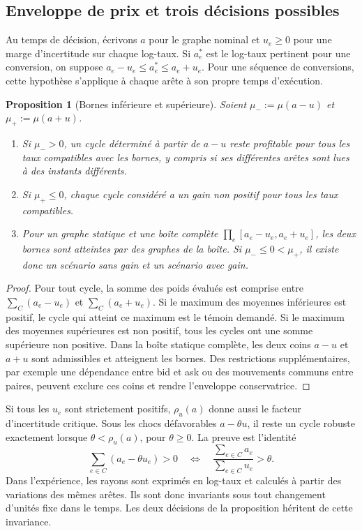 \documentclass[11pt,a4paper]{article}
\theoremstyle{clair}
\newtheorem{proposition}{Proposition}[section]
\begin{document}
\clearpage
\subsection{Enveloppe de prix et trois décisions possibles}

Au temps de décision, écrivons $a$ pour le graphe nominal et $u_e\ge0$ pour une marge d'incertitude sur chaque log-taux. Si $a_e^\ast$ est le log-taux pertinent pour une conversion, on suppose $a_e-u_e\le a_e^\ast\le a_e+u_e$. Pour une séquence de conversions, cette hypothèse s'applique à chaque arête à son propre temps d'exécution.

\begin{proposition}[Bornes inférieure et supérieure]
\label{prop:robust}
Soient $\mu_-:=\mu(a-u)$ et $\mu_+:=\mu(a+u)$.
\begin{enumerate}
 \item Si $\mu_->0$, un cycle déterminé à partir de $a-u$ reste profitable pour tous les taux compatibles avec les bornes, y compris si ses différentes arêtes sont lues à des instants différents.
 \item Si $\mu_+\le0$, chaque cycle considéré a un gain non positif pour tous les taux compatibles.
 \item Pour un graphe statique et une boîte complète $\prod_e[a_e-u_e,a_e+u_e]$, les deux bornes sont atteintes par des graphes de la boîte. Si $\mu_-\le0<\mu_+$, il existe donc un scénario sans gain et un scénario avec gain.
\end{enumerate}
\end{proposition}
\begin{proof}
Pour tout cycle, la somme des poids évalués est comprise entre $\sum_C(a_e-u_e)$ et $\sum_C(a_e+u_e)$. Si le maximum des moyennes inférieures est positif, le cycle qui atteint ce maximum est le témoin demandé. Si le maximum des moyennes supérieures est non positif, tous les cycles ont une somme supérieure non positive. Dans la boîte statique complète, les deux coins $a-u$ et $a+u$ sont admissibles et atteignent les bornes. Des restrictions supplémentaires, par exemple une dépendance entre bid et ask ou des mouvements communs entre paires, peuvent exclure ces coins et rendre l'enveloppe conservatrice.
\end{proof}

Si tous les $u_e$ sont strictement positifs, $\rho_u(a)$ donne aussi le facteur d'incertitude critique. Sous les chocs défavorables $a-\theta u$, il reste un cycle robuste exactement lorsque $\theta<\rho_u(a)$, pour $\theta\ge0$. La preuve est l'identité
\[
 \sum_{e\in C}(a_e-\theta u_e)>0
 \quad\Longleftrightarrow\quad
 \frac{\sum_{e\in C}a_e}{\sum_{e\in C}u_e}>\theta .
\]
Dans l'expérience, les rayons sont exprimés en log-taux et calculés à partir des variations des mêmes arêtes. Ils sont donc invariants sous tout changement d'unités fixe dans le temps. Les deux décisions de la proposition héritent de cette invariance.
\end{document}
